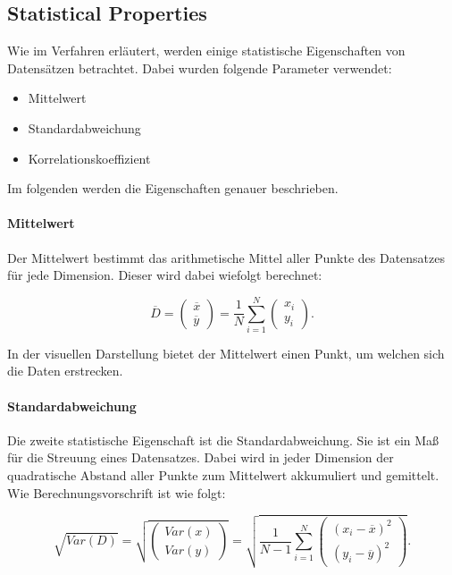 \documentclass[sigconf]{acmart}
\begin{document}
\subsection{Statistical Properties}\label{sec:algo:stats}

Wie im Verfahren erläutert, werden einige statistische Eigenschaften von Datensätzen betrachtet. Dabei wurden folgende Parameter verwendet:

\begin{itemize}
  \item Mittelwert
  \item Standardabweichung
  \item Korrelationskoeffizient
\end{itemize}

Im folgenden werden die Eigenschaften genauer beschrieben.

\paragraph{Mittelwert}

Der Mittelwert bestimmt das arithmetische Mittel aller Punkte des Datensatzes für jede Dimension. Dieser wird dabei wiefolgt berechnet:

$$
\overline{D} = \left( \begin{array}{c} \overline{x} \\ \overline{y}  \end{array}\right) = \frac 1 N \sum_{i=1}^{N} \left( \begin{array}{c} x_i \\ y_i  \end{array}\right).
$$

In der visuellen Darstellung bietet der Mittelwert einen Punkt, um welchen sich die Daten erstrecken. 

\paragraph{Standardabweichung}

Die zweite statistische Eigenschaft ist die Standardabweichung. Sie ist ein Maß für die Streuung eines Datensatzes. Dabei wird in jeder Dimension der quadratische Abstand aller Punkte zum Mittelwert akkumuliert und gemittelt. Wie Berechnungsvorschrift ist wie folgt:  

$$
\sqrt{Var(D)}=\sqrt{\left( \begin{array}{c} Var(x) \\ Var(y)  \end{array}\right)} = \sqrt{\frac{1}{N-1} \sum_{i=1}^{N} \left( \begin{array}{c} (x_i-\overline{x})^2  \\ (y_i-\overline{y})^2  \end{array}\right)}.
$$
\end{document}

